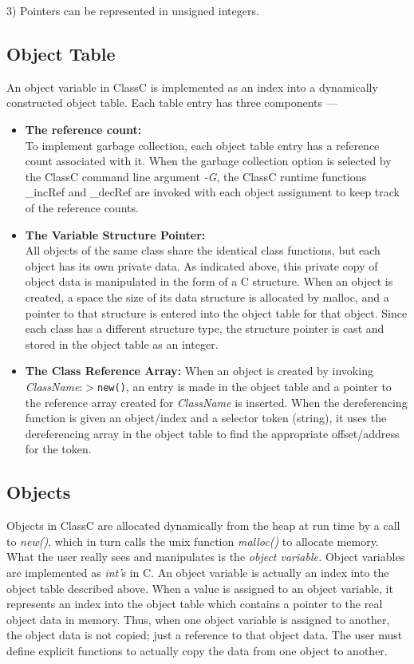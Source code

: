 3) Pointers can be represented in unsigned integers.

\subsection{Object Table}
An object variable in ClassC is implemented as an index into a
dynamically constructed object table.  Each table entry
has three components ---
\begin{itemize}
\item {\bf The reference count:}\\
To implement garbage collection, each object table entry has a
reference count associated with it.  When the garbage collection option is
selected by the ClassC command line argument
{\em -G}, the ClassC runtime functions \_incRef and \_decRef are invoked
with each object assignment to keep track of the reference counts.
\item {\bf The Variable Structure Pointer:\\}
All objects of the same class share the identical class functions, but each
object has its own private data.  As indicated above, this private copy of
object data is manipulated in the form of a C structure.  When an object is
created, a space the size of its data structure is allocated by malloc, and
a pointer to that structure is entered into the object table for that
object.  Since each class has a different structure type, the structure
pointer is cast and stored in the object table as an integer.
\item {\bf The Class Reference Array:}%
When an object is created by invoking {\em ClassName}:$>${\tt new()}, an
entry is made in the object table and a pointer to the reference array
created for {\em ClassName} is inserted.  When the dereferencing function
is given an object/index and a selector token (string), it uses the
dereferencing array in the object table to find the appropriate
offset/address for the token.
\end{itemize}
\subsection {Objects}
Objects in ClassC are allocated dynamically from the heap at run time
by a call to {\em new()}, which in turn calls the unix function {\em malloc()}
to allocate memory.
What the user really sees and manipulates is the 
{\em object variable.} Object variables are implemented as
{\em int'}s in C.  An object variable is actually an index into the object
table described above.  When
a value is assigned to an object variable, it represents an index into the
object table which contains a pointer to the real object data in memory.
Thus, when one object variable is assigned to another, the object
data is not copied; just a reference to that object data.  The user must
define explicit functions to actually copy the data from one object to
another.

